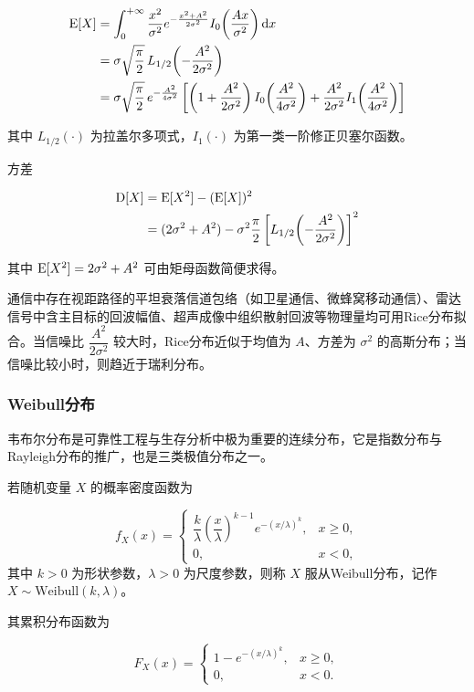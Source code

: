 \begin{align*}
\operatorname{E}[X] &= \int_{0}^{+\infty} \dfrac{x^2}{\sigma^2} e^{-\frac{x^2 + A^2}{2\sigma^2}} I_0\!\left(\dfrac{Ax}{\sigma^2}\right) \mathop{}\!\mathrm{d} x \\
&= \sigma \sqrt{\frac{\pi}{2}} \, L_{1/2}\!\left(-\frac{A^2}{2\sigma^2}\right) \\
&= \sigma \sqrt{\frac{\pi}{2}} \, e^{-\frac{A^2}{4\sigma^2}} \left[ \left(1 + \frac{A^2}{2\sigma^2}\right) I_0\!\left(\frac{A^2}{4\sigma^2}\right) + \frac{A^2}{2\sigma^2} I_1\!\left(\frac{A^2}{4\sigma^2}\right) \right]
\end{align*}

其中 $L_{1/2}(\cdot)$ 为拉盖尔多项式，$I_1(\cdot)$ 为第一类一阶修正贝塞尔函数。

方差

\begin{align*}
\operatorname{D}[X] &= \operatorname{E}[X^2] - (\operatorname{E}[X])^2 \\
&= (2\sigma^2 + A^2) - \sigma^2 \frac{\pi}{2} \left[ L_{1/2}\!\left(-\frac{A^2}{2\sigma^2}\right) \right]^2
\end{align*}

其中 $\operatorname{E}[X^2] = 2\sigma^2 + A^2$ 可由矩母函数简便求得。

通信中存在视距路径的平坦衰落信道包络（如卫星通信、微蜂窝移动通信）、雷达信号中含主目标的回波幅值、超声成像中组织散射回波等物理量均可用Rice分布拟合。当信噪比 $\dfrac{A^2}{2\sigma^2}$ 较大时，Rice分布近似于均值为 $A$、方差为 $\sigma^2$ 的高斯分布；当信噪比较小时，则趋近于瑞利分布。

\subsubsection{Weibull分布}

韦布尔分布是可靠性工程与生存分析中极为重要的连续分布，它是指数分布与Rayleigh分布的推广，也是三类极值分布之一。

若随机变量 $X$ 的概率密度函数为

\[
f_X(x) = \begin{cases}
    \dfrac{k}{\lambda} \left( \dfrac{x}{\lambda} \right)^{k-1} e^{-(x/\lambda)^k}, & x \geq 0,\\
    0, & x < 0,
\end{cases}
\]
其中 $k > 0$ 为形状参数，$\lambda > 0$ 为尺度参数，则称 $X$ 服从Weibull分布，记作 $X \sim \mathrm{Weibull}(k, \lambda)$。

其累积分布函数为

\[
F_X(x) = \begin{cases}
    1 - e^{-(x/\lambda)^k}, & x \geq 0,\\[6pt]
    0, & x < 0.
\end{cases}
\]

